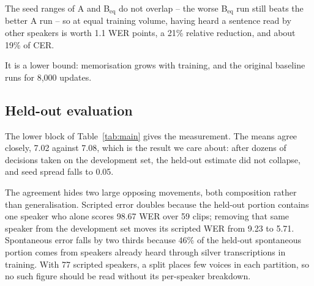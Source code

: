 The seed ranges of A and B$_{\text{eq}}$ do not overlap -- the worse
B$_{\text{eq}}$ run still beats the better A run -- so at equal training
volume, having heard a sentence read by other speakers is worth 1.1 WER points,
a 21\% relative reduction, and about 19\% of CER.

It is a lower bound: memorisation grows with training, and the original
baseline runs for 8{,}000 updates.

\subsection{Held-out evaluation}
\label{sec:heldout-results}


The lower block of Table~\ref{tab:main} gives the measurement. The means agree
closely, 7.02 against 7.08, which is the result we care about:
after dozens of decisions taken on the development set, the held-out estimate
did not collapse, and seed spread falls to 0.05.

The agreement hides two large opposing movements, both composition rather than
generalisation. Scripted error doubles because the held-out portion contains
one speaker who alone scores 98.67 WER over 59 clips; removing that same
speaker from the development set moves its scripted WER from 9.23 to 5.71.
Spontaneous error falls by two thirds because 46\% of the held-out spontaneous
portion comes from speakers already heard through silver transcriptions in
training. With 77 scripted speakers, a split places few voices in each
partition, so no such figure should be read without its per-speaker breakdown.


